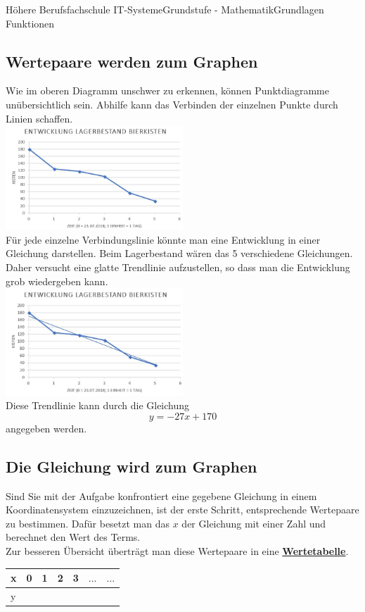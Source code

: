 \documentclass[11pt,twocolumn,oneside,openany,headings=optiontotoc,11pt,numbers=noenddot]{article}
\begin{document}
\begin{worksheet}{Höhere Berufsfachschule IT-Systeme}{Grundstufe - Mathematik}{Grundlagen Funktionen}
		\subsection{Wertepaare werden zum Graphen}
		Wie im oberen Diagramm unschwer zu erkennen, können Punktdiagramme unübersichtlich sein. Abhilfe kann das Verbinden der einzelnen Punkte durch Linien schaffen.\\
		\includegraphics[width=0.5\textwidth]{../99_Bilder/bier1.jpg}\\
		Für jede einzelne Verbindungslinie könnte man eine Entwicklung in einer Gleichung darstellen. Beim Lagerbestand wären das 5 verschiedene Gleichungen.\\
		Daher versucht eine glatte Trendlinie aufzustellen, so dass man die Entwicklung grob wiedergeben kann.\\
		\includegraphics[width=0.5\textwidth]{../99_Bilder/bier2.jpg}\\
		Diese Trendlinie kann durch die Gleichung
		\[y = -27x + 170\]
		angegeben werden.
		\subsection{Die Gleichung wird zum Graphen}
		Sind Sie mit der Aufgabe konfrontiert eine gegebene Gleichung in einem Koordinatensystem einzuzeichnen, ist der erste Schritt, entsprechende Wertepaare zu bestimmen. Dafür besetzt man das \(x\) der Gleichung mit einer Zahl und berechnet den Wert des Terms.\\
		Zur besseren Übersicht überträgt man diese Wertepaare in eine \textbf{\underline{Wertetabelle}}.\\
		\par\bigskip\noindent
		\begin{tabularx}{0.45\textwidth}{|X|X|X|X|X|X|X|}
			\hline
			x & 0 & 1 & 2 & 3 & \(\ldots\) & \(\ldots\)\\
			\hline
			y & & & & & & \\
			\hline
		\end{tabularx}

\end{worksheet}
\end{document}
